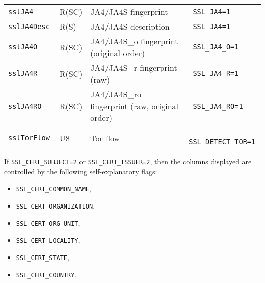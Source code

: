 \documentclass[documentation]{subfiles}
\begin{document}
\begin{longtable}{>{\tt}lll>{\tt\small}l}
    \\
    sslJA4                                       & R(SC)         & JA4/JA4S fingerprint                           & SSL\_JA4=1\\
    sslJA4Desc                                   & R(S)          & JA4/JA4S description                           & SSL\_JA4=1\\
    sslJA4O                                      & R(SC)         & JA4/JA4S\_o fingerprint (original order)       & SSL\_JA4\_O=1\\
    sslJA4R                                      & R(SC)         & JA4/JA4S\_r fingerprint (raw)                  & SSL\_JA4\_R=1\\
    sslJA4RO                                     & R(SC)         & JA4/JA4S\_ro fingerprint (raw, original order) & SSL\_JA4\_RO=1\\
    \\
    sslTorFlow                                   & U8            & Tor flow                                       & SSL\_DETECT\_TOR=1\\
    \bottomrule
\end{longtable}

If {\tt SSL\_CERT\_SUBJECT=2} or {\tt SSL\_CERT\_ISSUER=2}, then the columns displayed are controlled by the following self-explanatory flags:
\begin{itemize}
    \item {\tt SSL\_CERT\_COMMON\_NAME},
    \item {\tt SSL\_CERT\_ORGANIZATION},
    \item {\tt SSL\_CERT\_ORG\_UNIT},
    \item {\tt SSL\_CERT\_LOCALITY},
    \item {\tt SSL\_CERT\_STATE},
    \item {\tt SSL\_CERT\_COUNTRY}.
\end{itemize}

\clearpage
\end{document}
